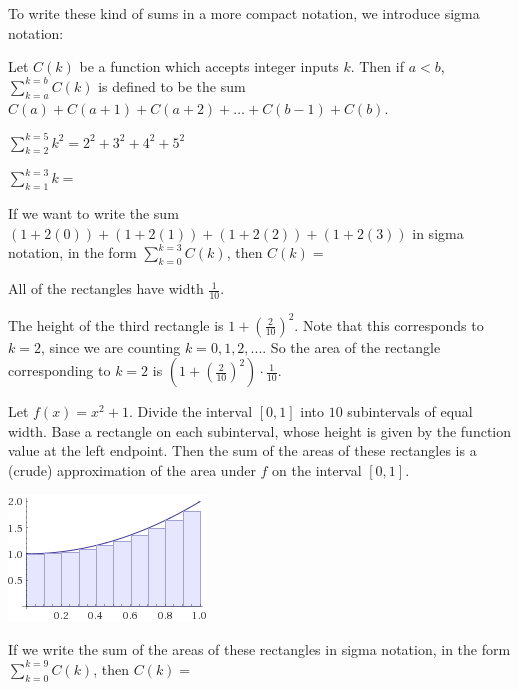 \documentclass{ximera}
\begin{document}
To write these kind of sums in a more compact notation, we introduce
sigma notation:

\begin{definition}
  Let $C(k)$ be a function which accepts integer inputs $k$.  Then if
  $a < b$, $\displaystyle\sum_{k=a}^{k=b} C(k)$ is defined to be the sum
  $C(a)+C(a+1)+C(a+2)+\dots +C(b-1)+C(b)$.
\end{definition}

\begin{example}
  $\displaystyle\sum_{k=2}^{k=5} k^2 = 2^2+3^2+4^2+5^2$
\end{example}

\begin{question}
	$\displaystyle\sum_{k=1}^{k=3} k = $
\end{question}

\begin{question}
  If we want to write the sum $(1+2(0))+(1+2(1))+(1+2(2))+(1+2(3))$ in
  sigma notation, in the form $\displaystyle\sum_{k=0}^{k=3} C(k)$, then
  $C(k)=$
\end{question}

\begin{question}
  \begin{hint}
    All of the rectangles have width $\frac{1}{10}$.
  \end{hint}
  \begin{hint}
    The height of the third rectangle is $1+(\frac{2}{10})^2$.  Note that this corresponds to $k=2$, since we are counting $k=0,1,2,...$.  So the area of the rectangle corresponding to $k=2$ is $(1+(\frac{2}{10})^2) \cdot \frac{1}{10}$.
  \end{hint}
  Let $f(x) = x^2+1$.  Divide the interval $[0,1]$ into $10$ subintervals of equal width.  Base a rectangle on each subinterval, whose height is given by the function value at the left endpoint.  Then the sum of the areas of these rectangles is a (crude) approximation of the area under $f$ on the interval $[0,1]$.
	
\begin{image}
\includegraphics{riemann2.png}
\end{image}
	
  If we write the sum of the areas of these rectangles in sigma notation, in the form $\displaystyle \sum_{k=0}^{k=9} C(k)$, then $C(k) = $
\end{question}
\end{document}
